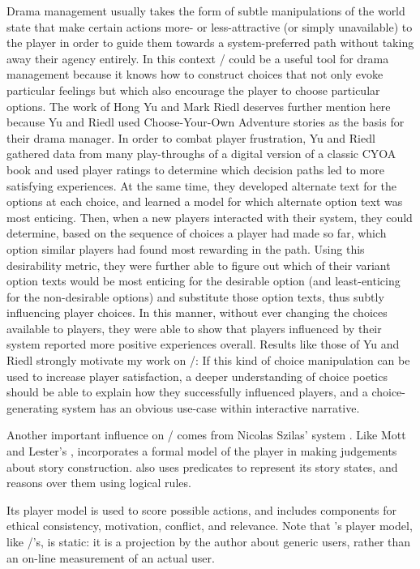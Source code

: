 Drama management usually takes the form of subtle manipulations of the world state that make certain actions more- or less-attractive (or simply unavailable) to the player in order to guide them towards a system-preferred path without taking away their agency entirely.
%
In this context \dunyazad/ could be a useful tool for drama management because it knows how to construct choices that not only evoke particular feelings but which also encourage the player to choose particular options.
%
The work of Hong Yu and Mark Riedl \citep{Yu2013} deserves further mention here because Yu and Riedl used Choose-Your-Own Adventure stories as the basis for their drama manager.
%
In order to combat player frustration, Yu and Riedl gathered data from many play-throughs of a digital version of a classic CYOA book and used player ratings to determine which decision paths led to more satisfying experiences.
%
At the same time, they developed alternate text for the options at each choice, and learned a model for which alternate option text was most enticing.
%
Then, when a new players interacted with their system, they could determine, based on the sequence of choices a player had made so far, which option similar players had found most rewarding in the path.
%
Using this desirability metric, they were further able to figure out which of their variant option texts would be most enticing for the desirable option (and least-enticing for the non-desirable options) and substitute those option texts, thus subtly influencing player choices.
%
In this manner, without ever changing the choices available to players, they were able to show that players influenced by their system reported more positive experiences overall.
%
Results like those of Yu and Riedl strongly motivate my work on \dunyazad/: If this kind of choice manipulation can be used to increase player satisfaction, a deeper understanding of choice poetics should be able to explain how they successfully influenced players, and a choice-generating system has an obvious use-case within interactive narrative.


Another important influence on \dunyazad/ comes from Nicolas Szilas'  system \citep{Szilas2003,Szilas2007}.
%
Like Mott and Lester's ,  incorporates a formal model of the player in making judgements about story construction.
%
 also uses predicates to represent its story states, and reasons over them using logical rules.

Its player model is used to score possible actions, and includes components for ethical consistency, motivation, conflict, and relevance.
%
Note that 's player model, like \dunyazad/'s, is static: it is a projection by the author about generic users, rather than an on-line measurement of an actual user.


